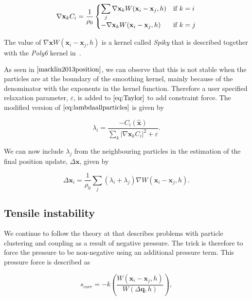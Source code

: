 \begin{equation}
 \nabla \mathbf{x}_k C_i = \frac{1}{\rho_0}
  \begin{cases}
  \label{eq:NablaC}
   \displaystyle \sum\limits_{j} \nabla \mathbf{x}_k W(\mathbf{x}_i - \mathbf{x}_j, h) & $\text{if }$ k = i \\
   - \nabla \mathbf{x}_k W(\mathbf{x}_i - \mathbf{x}_j, h) & $\text{if }$ k = j \\
  \end{cases}
\end{equation}

The value of $ \nabla \mathbf{x} W(\mathbf{x}_i - \mathbf{x}_j, h) $ is a
kernel called \textit{Spiky} that is described together with the \textit{Poly6}
kernel in~\cite{muller2003particle}.

As seen in $\cite{macklin2013position}$, we can observe that this is not stable
when the particles are at the boundary of the smoothing kernel, mainly because
of the denominator with the exponents in the kernel function.  Therefore a user
specified relaxation parameter, $\varepsilon$, is added to $\ref{eq:Taylor}$ to
add constraint force. The modified version of $\ref{eq:lambdaallparticles}$ is
given by

\begin{equation}
\label{eq:LambdaEpsilon}
\lambda_i = \frac{- C_i(\hat{\mathbf{x}}) }{ \sum\limits_{k} |\nabla \mathbf{x}_k C_i|^2 + \varepsilon}.
\end{equation}

We can now include $\lambda_j$ from the neighbouring particles in the
estimation of the final position update, $\Delta \mathbf{x}$, given by

\begin{equation}
\label{eq:DeltaP}
\Delta \mathbf{x}_i = \frac{1}{\rho_0} \sum\limits_{j} (\lambda_i + \lambda_j) \nabla W(\mathbf{x}_i - \mathbf{x}_j, h).
\end{equation}

\subsection{Tensile instability} We continue to follow the theory at
\cite{macklin2013position} that describes problems with particle clustering and
coupling as a result of negative pressure. The trick is therefore to force the
pressure to be non-negative using an additional pressure term. This pressure
force is described as

\begin{equation}
\label{eq:Scorr}
s_{corr} = -k \left( \frac{W(\mathbf{x}_i - \mathbf{x}_j, h)}{W(\Delta \mathbf{q}, h)} \right),
\end{equation}

